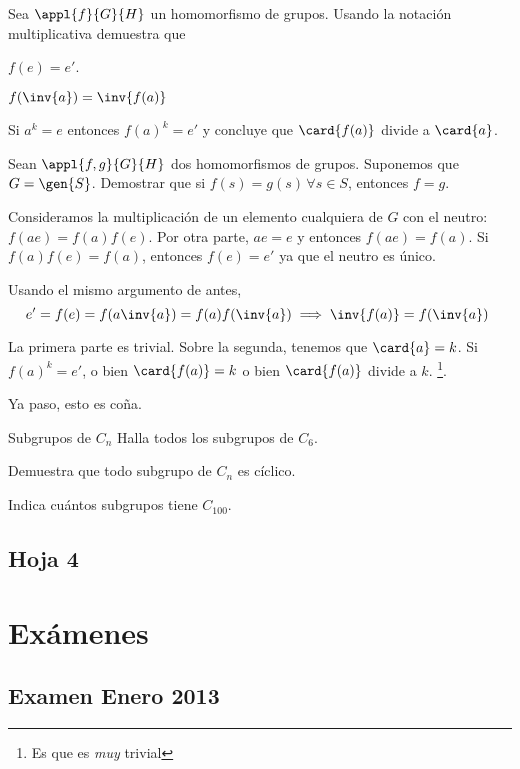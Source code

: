 \begin{problem}[6] Sea $\appl{f}{G}{H}$ un homomorfismo de grupos. Usando la notación multiplicativa demuestra que 

\ppart $f(e) = e'$.

\ppart $f(\inv{a}) = \inv{f(a)}$

\ppart Si $a^k = e$ entonces $f(a)^k = e'$ y concluye que $\card{f(a)}$ divide a $\card{a}$.

\ppart Sean $\appl{f,g}{G}{H}$ dos homomorfismos de grupos. Suponemos que $G=\gen{S}$. Demostrar que si $f(s) = g(s)\,∀s∈S$, entonces $f=g$.

\solution

\spart Consideramos la multiplicación de un elemento cualquiera de $G$ con el neutro: $f(ae) = f(a)f(e)$. Por otra parte, $ae = e$ y entonces $f(ae)=f(a)$. Si $f(a)f(e)=f(a)$, entonces $f(e) = e'$ ya que el neutro es único.

\spart Usando el mismo argumento de antes, \[ e' = f(e) = f(a\inv{a}) = f(a) f(\inv{a}) \implies \inv{f(a)} = f(\inv{a}) \]

\spart La primera parte es trivial. Sobre la segunda, tenemos que $\card{a} = k$. Si $f(a)^k=e'$, o bien $\card{f(a)} = k$ o bien $\card{f(a)}$ divide a $k$. \footnote{Es que es \textit{muy} trivial}.

\spart Ya paso, esto es coña.
 
\end{problem}

\begin{problem}[10] Subgrupos de $C_n$
\ppart Halla todos los subgrupos de $C_6$. 

\ppart Demuestra que todo subgrupo de $C_n$ es cíclico.

\ppart Indica cuántos subgrupos tiene $C_{100}$.

\solution


\end{problem}

\subsection{Hoja 4}

\section{Exámenes}

\subsection{Examen Enero 2013}

